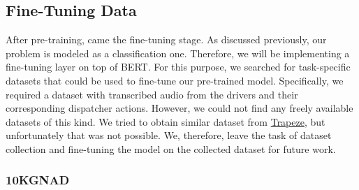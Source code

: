\subsection{Fine-Tuning Data}
\label{meth:s5_sub5}

After pre-training, came the fine-tuning stage. As discussed previously, our problem is modeled as a classification one. Therefore, we will be implementing a fine-tuning layer on top of \ac{BERT}. For this purpose, we searched for task-specific datasets that could be used to fine-tune our pre-trained model. Specifically, we required a dataset with transcribed audio from the drivers and their corresponding dispatcher actions. However, we could not find any freely available datasets of this kind. We tried to obtain similar dataset from \href{https://www.trapezegroup.eu/}{Trapeze}, but unfortunately that was not possible. We, therefore, leave the task of dataset collection and fine-tuning the model on the collected dataset for future work. 

\subsubsection{\ac{10KGNAD}}
\label{meth:s5_sub5_subsub1}

